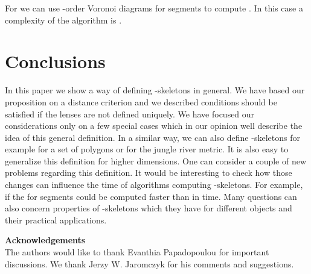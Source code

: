 \documentclass[11pt]{llncs}
\begin{document}
For  we can use -order Voronoi diagrams for segments to compute .
In this case a complexity of the algorithm is  \cite{km14}.


\section{Conclusions}

In this paper we show a way of defining -skeletons in general.
We have based our proposition on a distance criterion and we described conditions
should be satisfied if the lenses are not defined uniquely.
We have focused our considerations only on a few special cases which in our opinion
well describe the idea of this general definition.
In a similar way, we can also define -skeletons for example for a set of polygons
or for the jungle river metric.
It is also easy to generalize this definition for higher dimensions. 
One can consider a couple of new problems regarding this definition.
It would be interesting to check how those changes can influence the time 
of algorithms computing -skeletons. For example, if the  for segments could be
computed faster than in  time.
Many questions can also concern properties of -skeletons which they have for different objects
and their practical applications. 


\noindent
{\bf Acknowledgements}\\
\noindent
The authors would like to thank Evanthia Papadopoulou for important discussions. 
We thank Jerzy W. Jaromczyk for his comments and suggestions.
\end{document}
